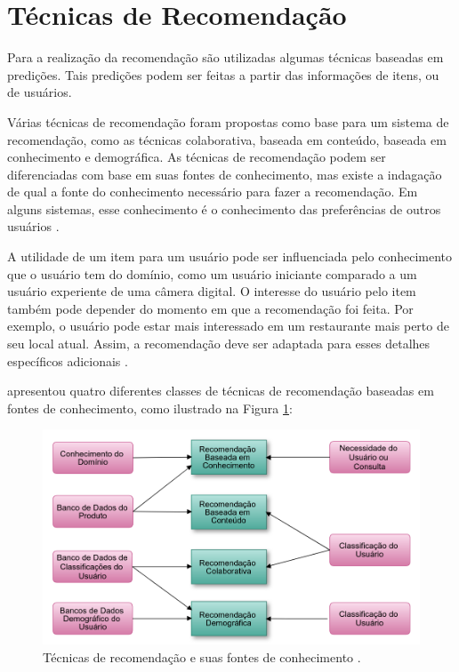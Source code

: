 \section{Técnicas de Recomendação}
\label{sec:tecnicsRecSys}

Para a realização da recomendação são utilizadas algumas técnicas baseadas em predições. Tais predições podem ser feitas a partir das informações de itens, ou de usuários.

Várias técnicas de recomendação foram propostas como base para um sistema de recomendação, como as técnicas colaborativa, baseada em conteúdo, baseada em conhecimento e demográfica. As técnicas de recomendação podem ser diferenciadas com base em suas fontes de conhecimento, mas existe a indagação de qual a fonte do conhecimento necessário para fazer a recomendação. Em alguns sistemas, esse conhecimento é o conhecimento das preferências de outros usuários \citep{Burke2007}.

A utilidade de um item para um usuário pode ser influenciada pelo conhecimento que o usuário tem do domínio, como um usuário iniciante comparado a um usuário experiente de uma câmera digital. O interesse do usuário pelo item também pode depender do momento em que a recomendação foi feita. Por exemplo, o usuário pode estar mais interessado em um restaurante mais perto de seu local atual. Assim, a recomendação deve ser adaptada para esses detalhes específicos adicionais \citep{Ricci:2010:RSH:1941884}.

\cite{Burke2007} apresentou quatro diferentes classes de técnicas de recomendação baseadas em fontes de conhecimento, como ilustrado na Figura \ref{fig:recommendation_techniques_knowledge_sources}:

\begin{figure}
	\centering
	\includegraphics[scale=0.63]{images/recommendation_techniques_knowledge_sources.png}
	\caption{Técnicas de recomendação e suas fontes de conhecimento \citep{Burke2007}.}
	\label{fig:recommendation_techniques_knowledge_sources}
\end{figure}

